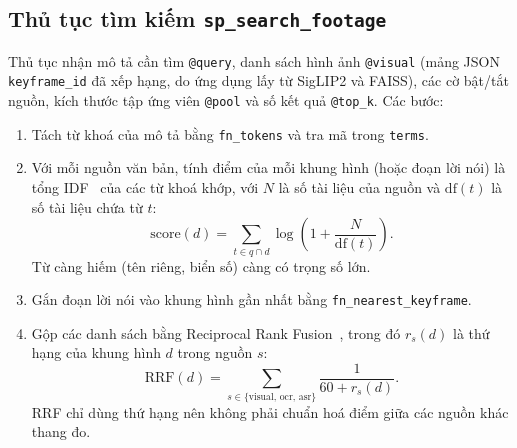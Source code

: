 \subsection{Thủ tục tìm kiếm \texttt{sp\_search\_footage}}

Thủ tục nhận mô tả cần tìm \texttt{@query}, danh sách hình ảnh \texttt{@visual} (mảng JSON
\texttt{keyframe\_id} đã xếp hạng, do ứng dụng lấy từ SigLIP2 và FAISS), các cờ bật/tắt
nguồn, kích thước tập ứng viên \texttt{@pool} và số kết quả \texttt{@top\_k}. Các bước:

\begin{enumerate}
    \item Tách từ khoá của mô tả bằng \texttt{fn\_tokens} và tra mã trong
    \texttt{terms}.
    \item Với mỗi nguồn văn bản, tính điểm của mỗi khung hình (hoặc đoạn lời nói) là tổng
    IDF~\cite{manning2008ir} của các từ khoá khớp, với $N$ là số tài liệu của nguồn và
    $\mathrm{df}(t)$ là số tài liệu chứa từ $t$:
    \begin{equation}
        \mathrm{score}(d) = \sum_{t \in q \cap d} \log\!\left(1 + \frac{N}{\mathrm{df}(t)}\right).
    \end{equation}
    Từ càng hiếm (tên riêng, biển số) càng có trọng số lớn.
    \item Gắn đoạn lời nói vào khung hình gần nhất bằng \texttt{fn\_nearest\_keyframe}.
    \item Gộp các danh sách bằng Reciprocal Rank Fusion~\cite{cormack2009rrf}, trong đó
    $r_s(d)$ là thứ hạng của khung hình $d$ trong nguồn $s$:
    \begin{equation}
        \mathrm{RRF}(d) = \sum_{s \in \{\text{visual},\,\text{ocr},\,\text{asr}\}} \frac{1}{60 + r_s(d)}.
    \end{equation}
    RRF chỉ dùng thứ hạng nên không phải chuẩn hoá điểm giữa các nguồn khác thang đo.
\end{enumerate}

